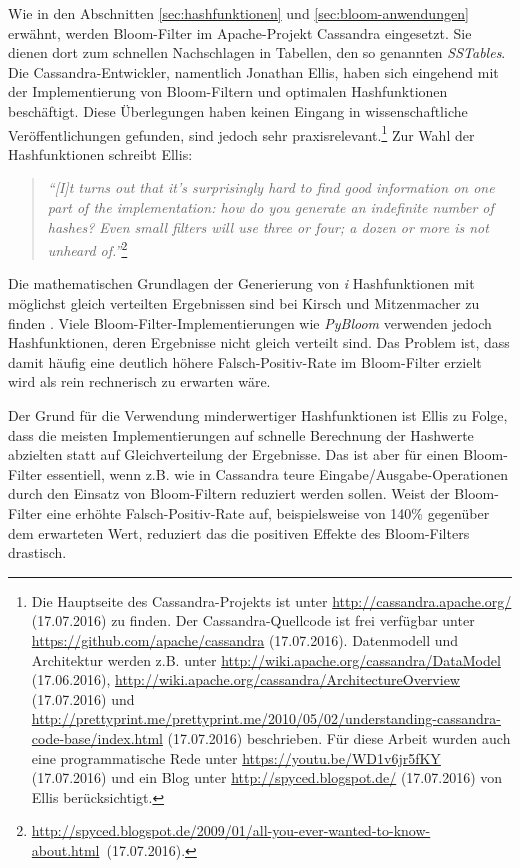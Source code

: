 Wie in den Abschnitten \ref{sec:hashfunktionen} und \ref{sec:bloom-anwendungen} erwähnt, werden Bloom-Filter im Apache-Projekt Cassandra eingesetzt. Sie dienen dort zum schnellen Nachschlagen in Tabellen, den so genannten \textit{SSTables}. Die Cassandra-Entwickler, namentlich Jonathan Ellis, haben sich eingehend mit der Implementierung von Bloom-Filtern und optimalen Hashfunktionen beschäftigt. Diese Überlegungen haben keinen Eingang in wissenschaftliche Veröffentlichungen gefunden, sind jedoch sehr praxisrelevant.\footnote{Die Hauptseite des Cassandra-Projekts ist unter \url{http://cassandra.apache.org/} (17.07.2016) zu finden. Der Cassandra-Quellcode ist frei verfügbar unter \url{https://github.com/apache/cassandra} (17.07.2016). Datenmodell und Architektur werden z.B. unter \url{http://wiki.apache.org/cassandra/DataModel} (17.06.2016), \url{http://wiki.apache.org/cassandra/ArchitectureOverview} (17.07.2016) und \url{http://prettyprint.me/prettyprint.me/2010/05/02/understanding-cassandra-code-base/index.html} (17.07.2016) beschrieben. Für diese Arbeit wurden auch eine programmatische Rede unter \url{https://youtu.be/WD1v6jr5fKY} (17.07.2016) und ein Blog unter \url{http://spyced.blogspot.de/} (17.07.2016) von Ellis berücksichtigt.} Zur Wahl der Hashfunktionen schreibt Ellis: 
\begin{quote}
\textit{"`[I]t turns out that it's surprisingly hard to find good information on one part of the implementation: how do you generate an indefinite number of hashes? Even small filters will use three or four; a dozen or more is not unheard of."'}\footnote{\mbox{\url{http://spyced.blogspot.de/2009/01/all-you-ever-wanted-to-know-about.html} (17.07.2016).}} 
\end{quote}
Die mathematischen Grundlagen der Generierung von \textit{i} Hashfunktionen mit möglichst gleich verteilten Ergebnissen sind bei Kirsch und Mitzenmacher zu finden \cite{Kirsch2006}. Viele Bloom-Filter-Implementierungen wie \textit{PyBloom} verwenden jedoch Hashfunktionen, deren Ergebnisse nicht gleich verteilt sind. Das Problem ist, dass damit häufig eine deutlich höhere Falsch-Positiv-Rate im Bloom-Filter erzielt wird als rein rechnerisch zu erwarten wäre. 

Der Grund für die Verwendung minderwertiger Hashfunktionen ist Ellis zu Folge, dass die meisten Implementierungen auf schnelle Berechnung der Hashwerte abzielten statt auf Gleichverteilung der Ergebnisse. Das ist aber für einen Bloom-Filter essentiell, wenn z.B. wie in Cassandra teure Eingabe/Ausgabe-Operationen durch den Einsatz von Bloom-Filtern reduziert werden sollen. Weist der Bloom-Filter eine erhöhte Falsch-Positiv-Rate auf, beispielsweise von 140\% gegenüber dem erwarteten Wert, reduziert das die positiven Effekte des Bloom-Filters drastisch.  

